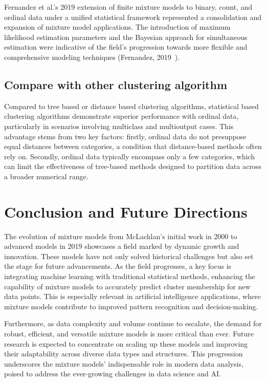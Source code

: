 \documentclass{article}
\begin{document}
Fernandez et al.'s 2019 extension of finite mixture models to binary, count, and ordinal data under a unified statistical framework represented a consolidation and expansion of mixture model applications. The introduction of maximum likelihood estimation parameters and the Bayesian approach for simultaneous estimation were indicative of the field's progression towards more flexible and comprehensive modeling techniques (Fernandez, 2019~\cite{fernandez2019finite}).

\subsection*{Compare with other clustering algorithm}

Compared to tree based or distance based clustering algorithms, statistical based clustering algorithms demonstrate superior performance with ordinal data, particularly in scenarios involving multiclass and multioutput cases. 
This advantage stems from two key factors: firstly, ordinal data do not presuppose equal distances between categories, a condition that distance-based methods often rely on. Secondly, ordinal data typically encompass only a few categories, which can limit the effectiveness of tree-based methods designed to partition data across a broader numerical range.
\section{Conclusion and Future Directions}

The evolution of mixture models from McLachlan's initial work in 2000 to advanced models in 2019 showcases a field marked by dynamic growth and innovation. These models have not only solved historical challenges but also set the stage for future advancements. As the field progresses, a key focus is integrating machine learning with traditional statistical methods, enhancing the capability of mixture models to accurately predict cluster membership for new data points. This is especially relevant in artificial intelligence applications, where mixture models contribute to improved pattern recognition and decision-making.

Furthermore, as data complexity and volume continue to escalate, the demand for robust, efficient, and versatile mixture models is more critical than ever. Future research is expected to concentrate on scaling up these models and improving their adaptability across diverse data types and structures. This progression underscores the mixture models' indispensable role in modern data analysis, poised to address the ever-growing challenges in data science and AI.

% 

\printbibliography
\end{document}
